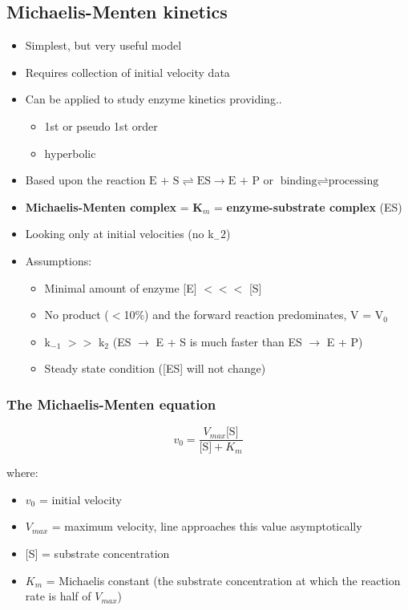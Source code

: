 \documentclass[letterpaper, 12pt]{article}
\begin{document}
\subsection*{Michaelis-Menten kinetics}

\begin{itemize}
\item Simplest, but very useful model
\item Requires collection of initial velocity data
\item Can be applied to study enzyme kinetics providing..
\begin{itemize}
\item 1st or pseudo 1st order
\item hyperbolic
\end{itemize}
\item Based upon the reaction $\text{E + S} \rightleftharpoons \text{ES} \to \text{E + P}$ or $\text{binding} \rightleftharpoons \text{processing}$
\item \textbf{Michaelis-Menten complex} = \textbf{K$_m$} = \textbf{enzyme-substrate complex} (ES)
\item Looking only at initial velocities (no k$_-2$)
\item Assumptions:
\begin{itemize}
\item Minimal amount of enzyme [E] $<<<$ [S]
\item No product ($<$10\%) and the forward reaction predominates, V = V$_0$
\item k$_{-1}$ $>>$ k$_2$ (ES $\to$ E + S is much faster than ES $\to$ E + P)
\item Steady state condition ([ES] will not change)
\end{itemize}
\end{itemize}

\subsubsection*{The Michaelis-Menten equation}

\begin{equation} \label{eq:mm}
v_0 = \frac{V_{max}\text{[S]}}{\text{[S]} + K_m}
\end{equation}

where:

\begin{itemize}
\item $v_0$ = initial velocity
\item $V_{max}$ = maximum velocity, line approaches this value asymptotically
\item $[$S$]$ = substrate concentration
\item $K_m$ = Michaelis constant (the substrate concentration at which the reaction rate is half of $V_{max}$)
\end{itemize}
\end{document}
